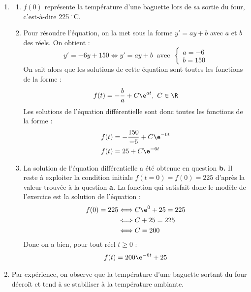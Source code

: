 \begin{enumerate}
\item 
	\begin{enumerate}
		\item
$f(0)$ représente la température d'une baguette lors de sa sortie du four, c'est-à-dire 225 $^{\circ}$C.		
		\item 
Pour résoudre l'équation, on la met sous la forme $y'=ay+b$ avec $a$ et $b$ des réels. On obtient :
        \begin{equation*}
            y'=-6y+150 \iff y'=ay+b \ \text{ avec } \ \begin{cases}
            a=-6 \\ b=150
            \end{cases}
        \end{equation*}
        On sait alors que les solutions de cette équation sont toutes les fonctions de la forme : 
        \begin{equation*}
            f(t)= - \dfrac{b}{a}+C\e^{at}, \ C \in \R
        \end{equation*}
 Les solutions de l'équation différentielle sont donc toutes les fonctions de la forme : 
        \begin{align*}
            f(t) &= - \dfrac{150}{-6} + C\e^{-6t} \\
            f(t) &= 25 + C\e^{-6t}
        \end{align*}		
		
		\item
La solution de l'équation différentielle a été obtenue en question \textbf{b.} Il reste à exploiter la condition initiale $f(t=0)=f(0)= 225$ d'après la valeur trouvée à la question \textbf{a.} La fonction qui satisfait donc le modèle de l'exercice est la solution de l'équation : 
        \begin{align*}
            f(0)= 225 &\Longleftrightarrow C\e^{0} + 25 = 225 \\
            &\Longleftrightarrow C + 25 = 225 \\
            &\Longleftrightarrow C= 200
        \end{align*}
        Donc on a bien, pour tout réel $t \geqslant 0$ : 
\begin{equation*}
    f(t)= 200\e^{-6t}+25
\end{equation*}		
		
	\end{enumerate}
\item Par expérience, on observe que la température d'une baguette sortant du four décroît et tend à se stabiliser à la température ambiante.




\end{enumerate}

